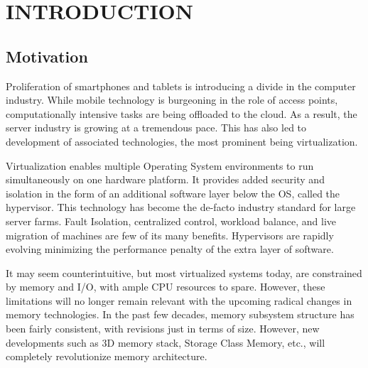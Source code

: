 %
%
%



\pagestyle{plain} %
\setcounter{page}{1}


\chapter{\uppercase {Introduction}}

\section{Motivation}
Proliferation of smartphones and tablets is introducing a divide in the computer industry. While mobile technology is burgeoning in the role of access points, computationally intensive tasks are being offloaded to the cloud. As a result, the server industry is growing at a tremendous pace. This has also led to development of associated technologies, the most prominent being virtualization.

Virtualization enables multiple Operating System environments to run simultaneously on one hardware platform. It provides added security and isolation in the form of an additional software layer below the OS, called the hypervisor. This technology has become the de-facto industry standard for large server farms. Fault Isolation, centralized control, workload balance, and live migration of machines are few of its many benefits. Hypervisors are rapidly evolving minimizing the performance penalty of the extra layer of software.

It may seem counterintuitive, but most virtualized systems today, are constrained by memory and I/O, with ample CPU resources to spare. However, these limitations will no longer remain relevant with the upcoming radical changes in memory technologies. In the past few decades, memory subsystem structure has been fairly consistent, with revisions just in terms of size. However, new developments such as 3D memory stack, Storage Class Memory, etc., will completely revolutionize memory architecture.

